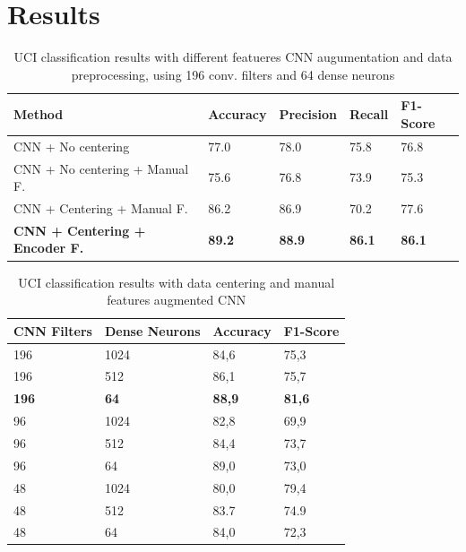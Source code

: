 
\section{Results}
\label{sec:results}

\begin{table}[t]
	\begin{center}
		\begin{tabular}{ p{7cm}p{2cm}p{2cm}p{2cm}p{2cm} } 
			\hline
			Method & Accuracy & Precision & Recall & F1-Score \\ 
			\hline
			CNN + No centering & 77.0 & 78.0 & 75.8 & 76.8 \\ 
			CNN + No centering + Manual F. & 75.6 & 76.8 & 73.9 & 75.3 \\
			CNN + Centering + Manual F. & 86.2 & 86.9 & 70.2 & 77.6 \\ 
			\textbf{CNN + Centering + Encoder F.} & \textbf{89.2} & \textbf{88.9} &  \textbf{86.1} & \textbf{86.1} \\ 
			\hline
		\end{tabular}
	\caption{\label{tab:model-performance} UCI classification results with different featueres CNN augumentation and data preprocessing, using 196 conv. filters and 64 dense neurons}
	\end{center}
\end{table}

\begin{table}
	\begin{center}
		\begin{tabular}{ p{1.8cm}p{1.7cm}p{1.7cm}p{1.7cm} } 
			\hline
			CNN Filters & Dense Neurons & Accuracy & F1-Score \\ 
			\hline
			196 & 1024 & 84,6 & 75,3 \\
			196 & 512 & 86,1 & 75,7 \\ 
			\textbf{196} & \textbf{64} & \textbf{88,9} & \textbf{81,6} \\ 
			96 & 1024 & 82,8 & 69,9 \\
			96 & 512 & 84,4 & 73,7 \\ 
			96 & 64 & 89,0 & 73,0 \\  
			48 & 1024 & 80,0 & 79,4 \\
			48 & 512 & 83.7 & 74.9 \\ 
			48 & 64 & 84,0 & 72,3 \\
			\hline
		\end{tabular}
	\caption{\label{tab:model-selection} UCI classification results with data centering and manual features augmented CNN}
	\end{center}
\end{table}

